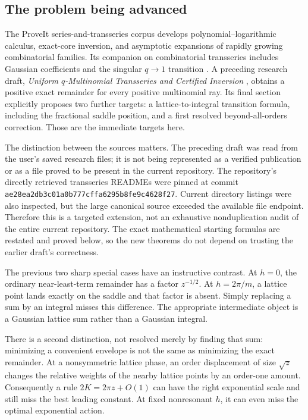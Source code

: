 \documentclass[11pt,a4paper]{article}
\numberwithin{equation}{section}
\theoremstyle{definition}\newtheorem{definition}[theorem]{Definition}
\theoremstyle{remark}\newtheorem{remark}[theorem]{Remark}
\begin{document}
\subsection{The problem being advanced}
The ProveIt series-and-transseries corpus develops polynomial--logarithmic
calculus, exact-core inversion, and asymptotic expansions of rapidly growing
combinatorial families. Its companion on combinatorial transseries includes
Gaussian coefficients and the singular $q\to1$ transition
\cite{repo,repo-group,repo-canonical}. A preceding research draft,
\emph{Uniform $q$-Multinomial Transseries and Certified Inversion}
\cite{prior}, obtains a positive exact remainder for every positive
multinomial ray. Its final section explicitly proposes two further targets:
a lattice-to-integral transition formula, including the fractional saddle
position, and a first resolved beyond-all-orders correction. Those are the
immediate targets here.

The distinction between the sources matters. The preceding draft was read
from the user's saved research files; it is not being represented as a
verified publication or as a file proved to be present in the current
repository. The repository's directly retrieved transseries READMEs were
pinned at commit \texttt{ae28ea2db3c01a0b777cffa6295b8fe9c4628f27}.
Current directory listings were also inspected, but the large canonical
source exceeded the available file endpoint. Therefore this is a targeted
extension, not an exhaustive nonduplication audit of the entire current
repository. The exact mathematical starting formulas are restated and
proved below, so the new theorems do not depend on trusting the earlier
draft's correctness.

The previous two sharp special cases have an instructive contrast. At
$h=0$, the ordinary near-least-term remainder has a factor $z^{-1/2}$.
At $h=2\pi/m$, a lattice point lands exactly on the saddle and that factor
is absent. Simply replacing a sum by an integral misses this difference.
The appropriate intermediate object is a Gaussian lattice sum rather than
a Gaussian integral.

There is a second distinction, not resolved merely by finding that sum:
minimizing a convenient envelope is not the same as minimizing the exact
remainder. At a nonsymmetric lattice phase, an order displacement of size
$\sqrt z$ changes the relative weights of the nearby lattice points by an
order-one amount. Consequently a rule $2K=2\pi z+O(1)$ can have the right
exponential scale and still miss the best leading constant. At fixed
nonresonant $h$, it can even miss the optimal exponential action.
\end{document}
